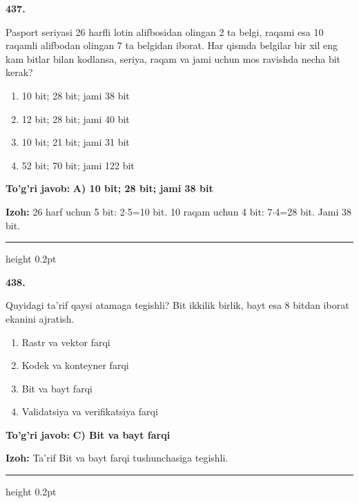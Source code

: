 \documentclass[10pt,a4paper,oneside]{article}
\begin{document}
\noindent\textbf{\color{ink}437.}
\par
Pasport seriyasi 26 harfli lotin alifbosidan olingan 2 ta belgi, raqami esa 10 raqamli alifbodan olingan 7 ta belgidan iborat. Har qismda belgilar bir xil eng kam bitlar bilan kodlansa, seriya, raqam va jami uchun mos ravishda necha bit kerak?
\begin{enumerate}[label=\Alph*),leftmargin=9mm]
\item 10 bit; 28 bit; jami 38 bit
\item 12 bit; 28 bit; jami 40 bit
\item 10 bit; 21 bit; jami 31 bit
\item 52 bit; 70 bit; jami 122 bit
\end{enumerate}
\begin{tcolorbox}[enhanced,breakable,colback=teal!4,colframe=teal!50!black,boxrule=0.5pt,arc=1.1mm,left=3mm,right=3mm,top=1.7mm,bottom=1.7mm,before skip=2mm,after skip=2mm]
\textbf{\color{teal}To'g'ri javob:} \textbf{A) 10 bit; 28 bit; jami 38 bit}
\par\smallskip
\textbf{Izoh:} 26 harf uchun 5 bit: 2\ensuremath{\cdot}5=10 bit. 10 raqam uchun 4 bit: 7\ensuremath{\cdot}4=28 bit. Jami 38 bit.
\end{tcolorbox}
\vspace{2mm}\hrule height 0.2pt \vspace{3mm}

\noindent\textbf{\color{ink}438.}
\par
Quyidagi ta'rif qaysi atamaga tegishli? Bit ikkilik birlik, bayt esa 8 bitdan iborat ekanini ajratish.
\begin{enumerate}[label=\Alph*),leftmargin=9mm]
\item Rastr va vektor farqi
\item Kodek va konteyner farqi
\item Bit va bayt farqi
\item Validatsiya va verifikatsiya farqi
\end{enumerate}
\begin{tcolorbox}[enhanced,breakable,colback=teal!4,colframe=teal!50!black,boxrule=0.5pt,arc=1.1mm,left=3mm,right=3mm,top=1.7mm,bottom=1.7mm,before skip=2mm,after skip=2mm]
\textbf{\color{teal}To'g'ri javob:} \textbf{C) Bit va bayt farqi}
\par\smallskip
\textbf{Izoh:} Ta'rif Bit va bayt farqi tushunchasiga tegishli.
\end{tcolorbox}
\vspace{2mm}\hrule height 0.2pt \vspace{3mm}
\end{document}
